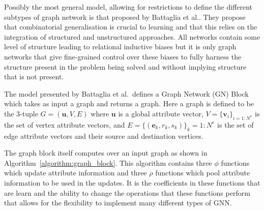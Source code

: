 Possibly the most general model, allowing for restrictions to define the different subtypes of graph network is that proposed by Battaglia et al.\cite{battaglia2018relational}. They propose that combinatorial generalisation is crucial to learning and that this relies on the integration of structured and unstructured approaches. All networks contain some level of structure leading to relational inductive biases but it is only graph networks that give fine-grained control over these biases to fully harness the structure present in the problem being solved and without implying structure that is not present.

The model presented by Battaglia et al.\ defines a Graph Network (GN) Block which takes as input a graph and returns a graph. Here a graph is defined to be the 3-tuple $G = (\bm{u}, V, E)$ where $\bm{u}$ is a global attribute vector, $V = \{\bm{v}_i\}_{i=1:N^v}$ is the set of vertex attribute vectors, and $E = \{(\bm{e}_k, r_k, s_k)\}_k=1:N^e$ is the set of edge attribute vectors and their source and destination vertices.

The graph block itself computes over an input graph as shown in Algorithm~\ref{algorithm:graph_block}. This algorithm contains three $\phi$ functions which update attribute information and three $\rho$ functions which pool attribute information to be used in the updates. It is the coefficients in these functions that are learn and the ability to change the operations that these functions perform that allows for the flexibility to implement many different types of GNN.

